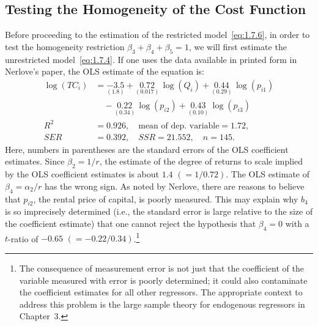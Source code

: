 
\subsection*{Testing the Homogeneity of the Cost Function}

Before proceeding to the estimation of the restricted model~\eqref{eq:1.7.6}, in order
to test the homogeneity restriction $\beta_3 + \beta_4 + \beta_5 = 1$, we will first
estimate the unrestricted model~\eqref{eq:1.7.4}.  If one uses the data available in
printed form in Nerlove's paper, the OLS estimate of the equation is:
\begin{equation}
\begin{aligned}
  \log(TC_i) &= \underset{(1.8)}{-3.5} + \underset{(0.017)}{0.72}\,\log(Q_i)
    + \underset{(0.29)}{0.44}\,\log(p_{i1}) \\
  &\quad - \underset{(0.34)}{0.22}\,\log(p_{i2})
    + \underset{(0.10)}{0.43}\,\log(p_{i3}) \\[6pt]
  R^2 &= 0.926,\quad \text{mean of dep.\ variable} = 1.72, \\
  SER &= 0.392,\quad SSR = 21.552,\quad n = 145.
\end{aligned}
\label{eq:1.7.7}
\end{equation}
Here, numbers in parentheses are the standard errors of the OLS coefficient estimates.
Since $\beta_2 = 1/r$, the estimate of the degree of returns to scale implied by the OLS
coefficient estimates is about $1.4$ $(= 1/0.72)$.  The OLS estimate of
$\beta_4 = \alpha_2/r$ has the wrong sign.  As noted by Nerlove, there are reasons to
believe that $p_{i2}$, the rental price of capital, is poorly measured.  This may explain
why $b_4$ is so imprecisely determined (i.e., the standard error is large relative to the
size of the coefficient estimate) that one cannot reject the hypothesis that $\beta_4 = 0$
with a $t$-ratio of $-0.65$ $(= -0.22/0.34)$.\footnote{The consequence of measurement
error is not just that the coefficient of the variable measured with error is poorly
determined; it could also contaminate the coefficient estimates for all other regressors.
The appropriate context to address this problem is the large sample theory for endogenous
regressors in Chapter~3.}

